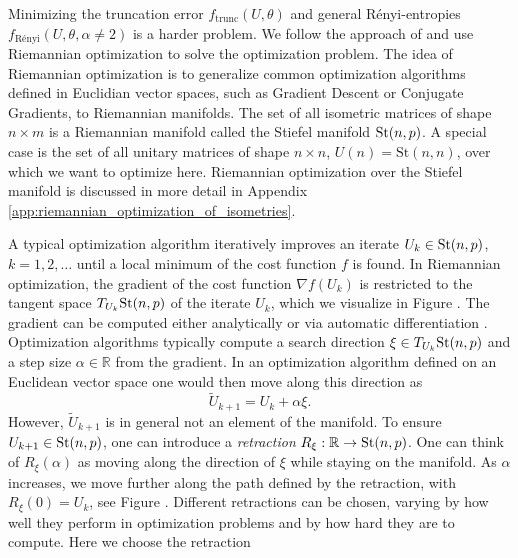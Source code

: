 Minimizing the truncation error $f_\text{trunc}\left(U,\theta\right)$ and general Rényi-entropies $f_\text{Rényi}\left(U,\theta,\alpha\neq2\right)$ is a harder problem. We follow the approach of \cite{cite:isometric_tensor_network_states_in_two_dimensions, cite:efficient_simulation_of_dynamics_in_two_dimensional_quantum_spin_systems} and use Riemannian optimization \cite{cite:optimization_on_matrix_manifolds, cite:optimization_techniques_on_riemannian_manifolds, cite:riemannian_optimization_isometric_tensor_networks, cite:riemannian_geometry_automatic_differentiation_quantum_physics, cite:pymanopt} to solve the optimization problem. The idea of Riemannian optimization is to generalize common optimization algorithms defined in Euclidian vector spaces, such as Gradient Descent or Conjugate Gradients, to Riemannian manifolds. The set of all isometric matrices of shape $n\times m$ is a Riemannian manifold called the Stiefel manifold $\text{St}(n,p)$. A special case is the set of all unitary matrices of shape $n\times n$, $U(n)=\text{St}(n, n)$, over which we want to optimize here. Riemannian optimization over the Stiefel manifold is discussed in more detail in Appendix \ref{app:riemannian_optimization_of_isometries}. \par
A typical optimization algorithm iteratively improves an iterate $U_k\in\text{St}(n,p)$, $k=1,2,\dots$ until a local minimum of the cost function $f$ is found. In Riemannian optimization, the gradient of the cost function $\nabla f\left(U_k\right)$ is restricted to the tangent space $T_{U_k}\text{St}(n,p)$ of the iterate $U_k$, which we visualize in Figure . The gradient can be computed either analytically or via automatic differentiation \cite{cite:riemannian_geometry_automatic_differentiation_quantum_physics, cite:pymanopt}. Optimization algorithms typically compute a search direction $\xi\in T_{U_k}\text{St}(n,p)$ and a step size $\alpha \in \mathbb{R}$ from the gradient. In an optimization algorithm defined on an Euclidean vector space one would then move along this direction as
\begin{equation}
	\tilde{U}_{k+1} = U_k + \alpha\xi.
\end{equation}
However, $\tilde{U}_{k+1}$ is in general not an element of the manifold. To ensure $U_{k+1}\in\text{St}(n,p)$, one can introduce a \textit{retraction} $R_\xi:\mathbb{R}\to\text{St}(n,p)$. One can think of $R_\xi\left(\alpha\right)$ as moving along the direction of $\xi$ while staying on the manifold. As $\alpha$ increases, we move further along the path defined by the retraction, with $R_\xi(0) = U_k$, see Figure . Different retractions can be chosen, varying by how well they perform in optimization problems and by how hard they are to compute. Here we choose the retraction
